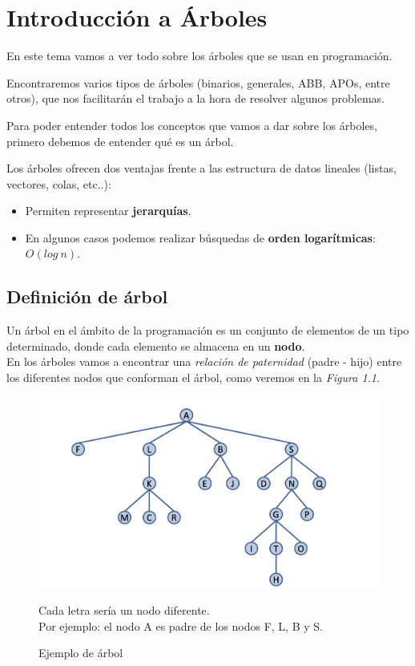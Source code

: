 \chapter{Introducción a Árboles}
En este tema vamos a ver todo sobre los árboles que se usan en programación.

Encontraremos varios tipos de árboles (binarios, generales, ABB, APOs, entre otros), que nos facilitarán el trabajo a la hora de resolver algunos problemas.

Para poder entender todos los conceptos que vamos a dar sobre los árboles, primero debemos de entender qué es un árbol.

Los árboles ofrecen dos ventajas frente a las estructura de datos lineales (listas, vectores, colas, etc..):
\begin{itemize}
  \item Permiten representar \textbf{jerarquías}.
  \item En algunos casos podemos realizar búsquedas de \textbf{orden logarítmicas}: \(O(log\ n)\).
\end{itemize}
\section{Definición de árbol}

Un árbol en el ámbito de la programación es un conjunto de elementos de un tipo determinado, donde cada elemento se almacena en un \textbf{nodo}.\\
En los árboles vamos a encontrar una \textit{relación de paternidad} (padre - hijo) entre los diferentes nodos que conforman el árbol, como veremos en la \textit{Figura 1.1}.

\begin{figure}[h]
  \begin{center}
    \includegraphics[width=\textwidth]{assets/IntroArboles1.png}
  \end{center}
  \caption{Ejemplo de árbol}
  Cada letra sería un nodo diferente.\\
  Por ejemplo: el nodo A es padre de los nodos F, L, B y S.
\end{figure}

